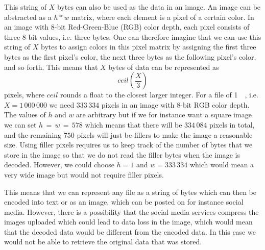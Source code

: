 This string of $X$ bytes can also be used as the data in an image. An image can be abstracted as a $h * w$ matrix, where each element is a pixel of a certain color. In an image with 8-bit Red-Green-Blue (RGB) color depth, each pixel consists of three 8-bit values, i.e. three bytes. One can therefore imagine that we can use this string of $X$ bytes to assign colors in this pixel matrix by assigning the first three bytes as the first pixel's color, the next three bytes as the following pixel's color, and so forth. This means that $X$ bytes of data can be represented as 
$$ceil(\frac{X}{3})$$ 
pixels, where $ceil$ rounds a float to the closest larger integer. For a file of \SI{1}{\mega\byte}, i.e. $X = 1\,000\,000$ we need $333\,334$ pixels in an image with 8-bit RGB color depth. The values of $h$ and $w$ are arbitrary but if we for instance want a square image we can set $ h\,=\,w\,=\,578$ which means that there will be $334\,084$ pixels in total, and the remaining $750$ pixels will just be fillers to make the image a reasonable size. Using filler pixels requires us to keep track of the number of bytes that we store in the image so that we do not read the filler bytes when the image is decoded. However, we could choose $h = 1$ and $w = 333\,334$ which would mean a very wide image but would not require filler pixels. 

This means that we can represent any file as a string of bytes which can then be encoded into text or as an image, which can be posted on for instance social media. However, there is a possibility that the social media services compress the images uploaded which could lead to data loss in the image, which would mean that the decoded data would be different from the encoded data. In this case we would not be able to retrieve the original data that was stored.